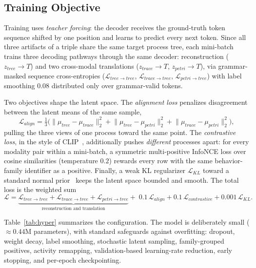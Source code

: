 \documentclass[manuscript,screen,nonacm]{acmart}
\begin{document}
\subsection{Training Objective}
\label{sec:training}

Training uses \emph{teacher forcing}: the decoder receives the ground-truth token sequence shifted by one position and learns to predict every next token. Since all three artifacts of a triple share the same target process tree, each mini-batch trains three decoding pathways through the same decoder: reconstruction ($z_{\mathit{tree}} \to T$) and two cross-modal translations ($z_{\mathit{trace}} \to T$, $z_{\mathit{petri}} \to T$), via grammar-masked sequence cross-entropies ($\mathcal{L}_{\mathit{tree}\to\mathit{tree}}$, $\mathcal{L}_{\mathit{trace}\to\mathit{tree}}$, $\mathcal{L}_{\mathit{petri}\to\mathit{tree}}$) with label smoothing $0.08$ distributed only over grammar-valid tokens.

Two objectives shape the latent space. The \emph{alignment loss} penalizes disagreement between the latent means of the same sample,
\begin{equation}
\mathcal{L}_{\mathit{align}} = \tfrac{1}{3}\big( \lVert\mu_{\mathit{tree}}-\mu_{\mathit{trace}}\rVert_2^2 + \lVert\mu_{\mathit{tree}}-\mu_{\mathit{petri}}\rVert_2^2 + \lVert\mu_{\mathit{trace}}-\mu_{\mathit{petri}}\rVert_2^2 \big),
\end{equation}
pulling the three views of one process toward the same point. The \emph{contrastive loss}, in the style of CLIP~\cite{Radford2021}, additionally pushes \emph{different} processes apart: for every modality pair within a mini-batch, a symmetric multi-positive InfoNCE loss over cosine similarities (temperature $0.2$) rewards every row with the same behavior-family identifier as a positive. Finally, a weak KL regularizer $\mathcal{L}_{\mathit{KL}}$ toward a standard normal prior~\cite{KingmaWelling2014} keeps the latent space bounded and smooth. The total loss is the weighted sum
\begin{equation}
\mathcal{L} = \underbrace{\mathcal{L}_{\mathit{tree}\to\mathit{tree}} + \mathcal{L}_{\mathit{trace}\to\mathit{tree}} + \mathcal{L}_{\mathit{petri}\to\mathit{tree}}}_{\text{reconstruction and translation}} + \; 0.1\,\mathcal{L}_{\mathit{align}} + 0.1\,\mathcal{L}_{\mathit{contrastive}} + 0.001\,\mathcal{L}_{\mathit{KL}}.
\label{eq:loss}
\end{equation}

Table~\ref{tab:hyper} summarizes the configuration. The model is deliberately small ($\approx$0.44M parameters), with standard safeguards against overfitting: dropout, weight decay, label smoothing, stochastic latent sampling, family-grouped positives, activity remapping, validation-based learning-rate reduction, early stopping, and per-epoch checkpointing.
\end{document}
